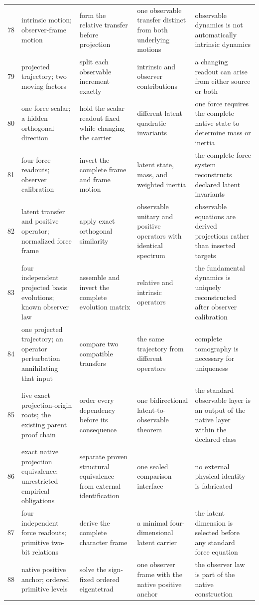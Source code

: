 \documentclass[11pt]{article}
\numberwithin{equation}{section}
\theoremstyle{remark}
\begin{document}
\begin{landscape}
\begin{longtable}{p{0.65cm}p{3.5cm}p{4.0cm}p{4.0cm}p{4.6cm}}
78&intrinsic motion; observer-frame motion&form the relative transfer before projection&one observable transfer distinct from both underlying motions&observable dynamics is not automatically intrinsic dynamics\\
79&projected trajectory; two moving factors&split each observable increment exactly&intrinsic and observer contributions&a changing readout can arise from either source or both\\
80&one force scalar; a hidden orthogonal direction&hold the scalar readout fixed while changing the carrier&different latent quadratic invariants&one force requires the complete native state to determine mass or inertia\\
81&four force readouts; observer calibration&invert the complete frame and frame motion&latent state, mass, and weighted inertia&the complete force system reconstructs declared latent invariants\\
82&latent transfer and positive operator; normalized force frame&apply exact orthogonal similarity&observable unitary and positive operators with identical spectrum&observable equations are derived projections rather than inserted targets\\
83&four independent projected basis evolutions; known observer law&assemble and invert the complete evolution matrix&relative and intrinsic operators&the fundamental dynamics is uniquely reconstructed after observer calibration\\
84&one projected trajectory; an operator perturbation annihilating that input&compare two compatible transfers&the same trajectory from different operators&complete tomography is necessary for uniqueness\\
85&five exact projection-origin roots; the existing parent proof chain&order every dependency before its consequence&one bidirectional latent-to-observable theorem&the standard observable layer is an output of the native layer within the declared class\\
86&exact native projection equivalence; unrestricted empirical obligations&separate proven structural equivalence from external identification&one sealed comparison interface&no external physical identity is fabricated\\
87&four independent force readouts; primitive two-bit relations&derive the complete character frame&a minimal four-dimensional latent carrier&the latent dimension is selected before any standard force equation\\
88&native positive anchor; ordered primitive levels&solve the sign-fixed ordered eigentetrad&one observer frame with the native positive anchor&the observer law is part of the native construction\\

\end{longtable}
\end{landscape}
\end{document}
